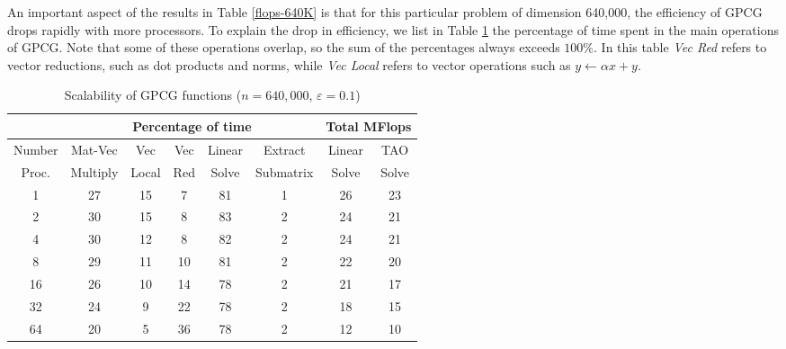An important aspect of the results in Table \ref{flops-640K} is that 
for this particular problem of dimension 640,000, the
efficiency of GPCG 
drops rapidly with more processors.
To explain the drop in efficiency, we
list in Table \ref{routines} the percentage of time spent in 
the main operations of GPCG.
Note that some of these operations overlap, so the sum
of the percentages always exceeds $ 100\% $.
In this table {\it Vec Red} refers to
vector reductions, such as dot products and norms,
while {\it Vec Local} refers to vector operations such as
$  y \leftarrow \alpha x + y $.

\begin{table}[ht]
\caption{Scalability of GPCG functions
($ n=640,000 $, $ \varepsilon = 0.1 $) }
\label{routines}
\begin{center}
\footnotesize
\begin{tabular}{|c|ccccc|cc|}
\cline{2-8}
\multicolumn{1}{c|}{} &
\multicolumn{5}{c|}{Percentage of time}&
\multicolumn{2}{c|}{Total MFlops} \\
\hline
\multicolumn{1}{|c|}{Number}&
\multicolumn{1}{c}{Mat-Vec}&
\multicolumn{1}{c}{Vec} &
\multicolumn{1}{c}{Vec} &
\multicolumn{1}{c}{Linear}&
\multicolumn{1}{c}{Extract}&
\multicolumn{1}{|c}{Linear}&
\multicolumn{1}{c|}{TAO} \\

\multicolumn{1}{|c|}{Proc.}&
\multicolumn{1}{c}{Multiply}&
\multicolumn{1}{c}{Local} &
\multicolumn{1}{c}{Red} &
\multicolumn{1}{c}{Solve}&
\multicolumn{1}{c}{Submatrix}&
\multicolumn{1}{|c}{Solve}&
\multicolumn{1}{c|}{Solve} \\

\hline
1 & 27 & 15 & 7 & 81 & 1 &26 & 23 \\ 
2 & 30 & 15 & 8 & 83 & 2 &24 & 21 \\ 
4 & 30 & 12 & 8 & 82 & 2 &24 & 21 \\ 
8 & 29 & 11 & 10 & 81 & 2 &22 & 20 \\ 
16 & 26 & 10 & 14 & 78 & 2 &21 & 17 \\ 
32 & 24 & 9 & 22 & 78 & 2 &18 & 15 \\ 
64 & 20 & 5 & 36 & 78 & 2 &12 & 10 \\ 
\hline
\end{tabular}
\end{center}
\end{table}

